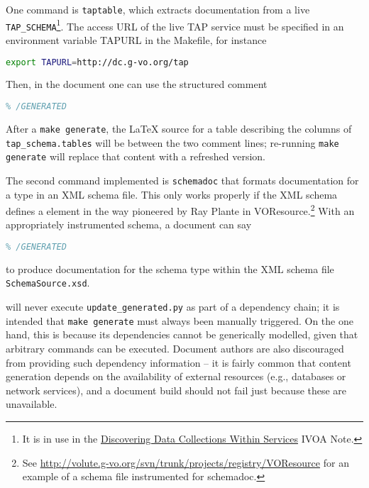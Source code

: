 \documentclass[11pt,a4paper]{ivoa}
\begin{document}
One command is \texttt{taptable}, which extracts documentation from a
live \texttt{TAP\_SCHEMA}\footnote{It is in use in the
\href{https://volute.g-vo.org/svn/trunk/projects/registry/discovercollections}{Discovering
Data Collections Within Services} IVOA Note.}.  The access URL of the
live TAP service must be specified in an environment variable TAPURL in
the Makefile, for instance

\begin{lstlisting}[language=sh]
export TAPURL=http://dc.g-vo.org/tap
\end{lstlisting}

Then, in the document one can use the structured comment

\begin{lstlisting}[language=TeX]
% GENERATED: !taptable tap_schema.tables
% /GENERATED
\end{lstlisting}

After a \texttt{make generate}, the LaTeX source for a table describing
the columns of \texttt{tap\_schema.tables} will be between the two
comment lines; re-running \texttt{make generate} will replace that
content with a refreshed version.

The second command implemented is \texttt{schemadoc} that formats
documentation for a type in an XML schema file.  This only works
properly if the XML schema defines a  element in
the way pioneered by Ray Plante in
VOResource.\footnote{See
\url{http://volute.g-vo.org/svn/trunk/projects/registry/VOResource} for
an example of a schema file instrumented for schemadoc.}
With an appropriately instrumented schema, a document can say

\begin{lstlisting}[language=TeX]
% GENERATED: !schemadoc SchemaSource.xsd MyType
% /GENERATED
\end{lstlisting}

to produce documentation for the schema type  within
the XML schema file \texttt{SchemaSource.xsd}.

\ivoatex will never execute \texttt{update\_generated.py} as part of a
dependency chain; it is intended that \texttt{make generate} must always
been manually triggered.  On the one hand, this is because its
dependencies cannot be generically modelled, given that arbitrary
commands can be executed.  Document authors are also discouraged from
providing such dependency information -- it is fairly common that
content generation depends on the availability of external resources
(e.g., databases or network services), and a document build should not
fail just because these are unavailable.
\end{document}
